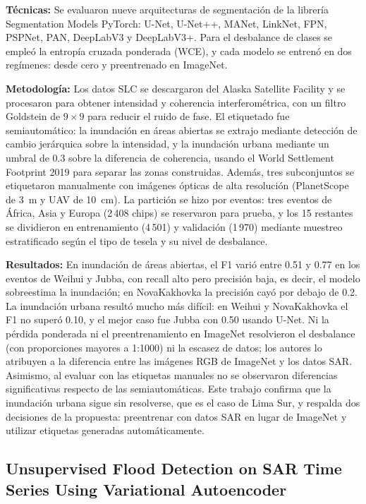 \documentclass[conference]{IEEEtran}
\begin{document}
\textbf{Técnicas:} Se evaluaron nueve arquitecturas de segmentación de la librería Segmentation Models PyTorch: U-Net, U-Net++, MANet, LinkNet, FPN, PSPNet, PAN, DeepLabV3 y DeepLabV3+. Para el desbalance de clases se empleó la entropía cruzada ponderada (WCE), y cada modelo se entrenó en dos regímenes: desde cero y preentrenado en ImageNet.

\textbf{Metodología:} Los datos SLC se descargaron del Alaska Satellite Facility y se procesaron para obtener intensidad y coherencia interferométrica, con un filtro Goldstein de $9\times9$ para reducir el ruido de fase. El etiquetado fue semiautomático: la inundación en áreas abiertas se extrajo mediante detección de cambio jerárquica sobre la intensidad, y la inundación urbana mediante un umbral de 0.3 sobre la diferencia de coherencia, usando el World Settlement Footprint 2019 para separar las zonas construidas. Además, tres subconjuntos se etiquetaron manualmente con imágenes ópticas de alta resolución (PlanetScope de 3~m y UAV de 10~cm). La partición se hizo por eventos: tres eventos de África, Asia y Europa (2\,408 chips) se reservaron para prueba, y los 15 restantes se dividieron en entrenamiento (4\,501) y validación (1\,970) mediante muestreo estratificado según el tipo de tesela y su nivel de desbalance.

\textbf{Resultados:} En inundación de áreas abiertas, el F1 varió entre 0.51 y 0.77 en los eventos de Weihui y Jubba, con recall alto pero precisión baja, es decir, el modelo sobreestima la inundación; en NovaKakhovka la precisión cayó por debajo de 0.2. La inundación urbana resultó mucho más difícil: en Weihui y NovaKakhovka el F1 no superó 0.10, y el mejor caso fue Jubba con 0.50 usando U-Net. Ni la pérdida ponderada ni el preentrenamiento en ImageNet resolvieron el desbalance (con proporciones mayores a 1:1000) ni la escasez de datos; los autores lo atribuyen a la diferencia entre las imágenes RGB de ImageNet y los datos SAR. Asimismo, al evaluar con las etiquetas manuales no se observaron diferencias significativas respecto de las semiautomáticas. Este trabajo confirma que la inundación urbana sigue sin resolverse, que es el caso de Lima Sur, y respalda dos decisiones de la propuesta: preentrenar con datos SAR en lugar de ImageNet y utilizar etiquetas generadas automáticamente.

\subsection{Unsupervised Flood Detection on SAR Time Series Using Variational Autoencoder \cite{yadav2024unsupervised}}
\end{document}
